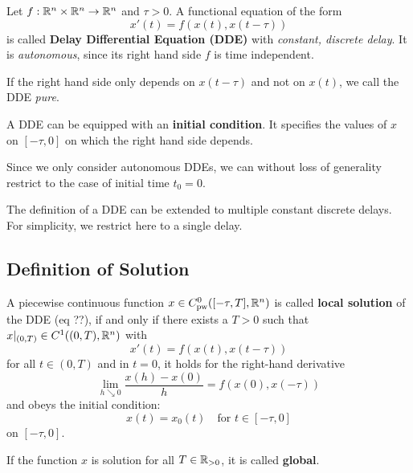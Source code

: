 \documentclass[10pt]{article}
\begin{document}
\begin{definition}
    \label{definition-dde}

    Let $f:\mathbb{R}^n\times\mathbb{R}^n\rightarrow\mathbb{R}^n$ and $\tau > 0$.
    A functional equation of the form
    \begin{equation}
        x'(t) = f\left(x(t),x(t-\tau)\right)
    \end{equation}
    is called \textbf{Delay Differential Equation (DDE)} with \emph{constant, discrete delay}. It is \emph{autonomous}, since its right hand side $f$ is time independent.

    If the right hand side only depends on $x(t-\tau)$ and not on $x(t)$, we call the DDE \emph{pure}.

    A DDE can be equipped with an \textbf{initial condition}. It specifies the values of $x$ on $[-\tau, 0]$ on which the right hand side depends.

\end{definition}

Since we only consider autonomous DDEs, we can without loss of generality restrict to the case of initial time $t_0=0$.

The definition of a DDE can be extended to multiple constant discrete delays. For simplicity, we restrict here to a single delay.

\subsection{Definition of Solution} \label{sec:definition-of-solution}

\begin{definition}
    \label{definition-solution-dde}

    A piecewise continuous function $x\in C^0_\text{pw}([-\tau,T],\mathbb{R}^n)$ is called \textbf{local solution} of the DDE (eq ??), if and only if there exists a $T>0$ such that $x|_{(0,T)}\in C^1((0,T),\mathbb{R}^n)$ with
    \begin{equation}
        x'(t) = f\left(x(t),x(t-\tau)\right)
    \end{equation}
    for all $t\in (0,T)$ and in $t=0$, it holds for the right-hand derivative \begin{equation}
        \lim_{h\searrow 0}\frac{x(h)-x(0)}{h}=f(x(0),x(-\tau))
    \end{equation}
    and obeys the initial condition:
    \begin{equation}
        x(t) = x_0(t) \quad\text{for } t\in [-\tau,0]
    \end{equation}
    on $[-\tau,0]$.



    If the function $x$ is solution for all $T\in\mathbb{R}_{>0}$, it is called \textbf{global}.

\end{definition}
\end{document}
